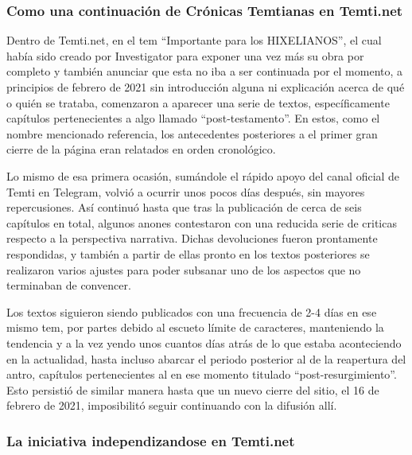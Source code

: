 \documentclass[
  spanish,
]{book}
\begin{document}
\hypertarget{como-una-continuaciuxf3n-de-cruxf3nicas-temtianas-en-temti.net}{%
\subsubsection*{Como una continuación de Crónicas Temtianas en Temti.net}\label{como-una-continuaciuxf3n-de-cruxf3nicas-temtianas-en-temti.net}}

Dentro de Temti.net, en el tem ``Importante para los HIXELIANOS'', el cual había sido creado por Investigator para exponer una vez más su obra por completo y también anunciar que esta no iba a ser continuada por el momento, a principios de febrero de 2021 sin introducción alguna ni explicación acerca de qué o quién se trataba, comenzaron a aparecer una serie de textos, específicamente capítulos pertenecientes a algo llamado ``post-testamento''. En estos, como el nombre mencionado referencia, los antecedentes posteriores a el primer gran cierre de la página eran relatados en orden cronológico.

Lo mismo de esa primera ocasión, sumándole el rápido apoyo del canal oficial de Temti en Telegram, volvió a ocurrir unos pocos días después, sin mayores repercusiones. Así continuó hasta que tras la publicación de cerca de seis capítulos en total, algunos anones contestaron con una reducida serie de criticas respecto a la perspectiva narrativa. Dichas devoluciones fueron prontamente respondidas, y también a partir de ellas pronto en los textos posteriores se realizaron varios ajustes para poder subsanar uno de los aspectos que no terminaban de convencer.

Los textos siguieron siendo publicados con una frecuencia de 2-4 días en ese mismo tem, por partes debido al escueto límite de caracteres, manteniendo la tendencia y a la vez yendo unos cuantos días atrás de lo que estaba aconteciendo en la actualidad, hasta incluso abarcar el periodo posterior al de la reapertura del antro, capítulos pertenecientes al en ese momento titulado ``post-resurgimiento''. Esto persistió de similar manera hasta que un nuevo cierre del sitio, el 16 de febrero de 2021, imposibilitó seguir continuando con la difusión allí.

\hypertarget{la-iniciativa-independizandose-en-temti.net}{%
\subsubsection*{La iniciativa independizandose en Temti.net}\label{la-iniciativa-independizandose-en-temti.net}}
\end{document}
